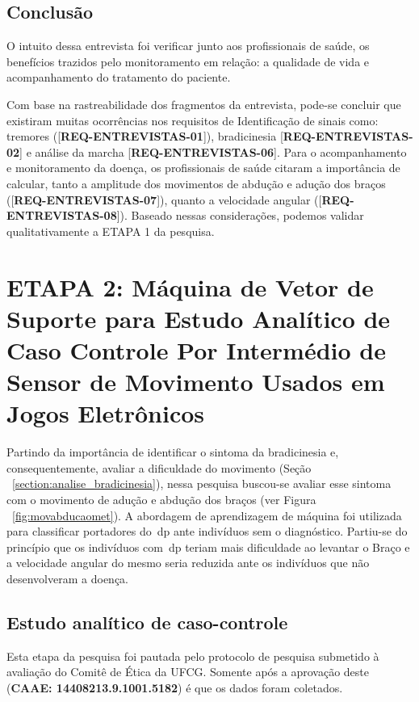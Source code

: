\subsection{Conclusão}
O intuito dessa entrevista foi verificar junto aos profissionais de saúde, os benefícios trazidos pelo monitoramento em relação: a qualidade de vida e acompanhamento do tratamento do paciente.

Com base na rastreabilidade dos fragmentos da entrevista, pode-se concluir que existiram muitas ocorrências nos requisitos de Identificação de sinais como: tremores ([\textbf{REQ-ENTREVISTAS-01}]), bradicinesia [\textbf{REQ-ENTREVISTAS-02}] e análise da marcha [\textbf{REQ-ENTREVISTAS-06}]. Para o acompanhamento e monitoramento da doença, os profissionais de saúde citaram a importância de calcular, tanto a amplitude dos movimentos de abdução e adução dos braços ([\textbf{REQ-ENTREVISTAS-07}]), quanto a velocidade angular ([\textbf{REQ-ENTREVISTAS-08}]). Baseado nessas considerações, podemos validar qualitativamente a ETAPA 1 da pesquisa.


\section{ETAPA 2: Máquina de Vetor de Suporte para Estudo Analítico de Caso Controle Por Intermédio de Sensor de Movimento Usados em Jogos Eletrônicos}\label{sec:resultado_svm}

Partindo da importância de identificar o sintoma da bradicinesia e, consequentemente, avaliar a dificuldade do movimento (Seção ~\ref{section:analise_bradicinesia}), nessa pesquisa buscou-se avaliar esse sintoma com o movimento de adução e abdução dos braços (ver Figura ~\ref{fig:movabducaomet}). A abordagem de aprendizagem de máquina foi utilizada para classificar portadores do~\ac{dp} ante indivíduos sem o diagnóstico. Partiu-se do princípio que os indivíduos com~\ac{dp} teriam mais dificuldade ao levantar o Braço e a velocidade angular do mesmo seria reduzida ante os indivíduos que não desenvolveram a doença.

\subsection{Estudo analítico de caso-controle}\label{section:estudo_caso_controle}
Esta etapa da pesquisa foi pautada pelo protocolo de pesquisa submetido à avaliação do Comitê de Ética da UFCG. Somente após a aprovação deste (\textbf{CAAE: 14408213.9.1001.5182}) é que os dados foram coletados. 

